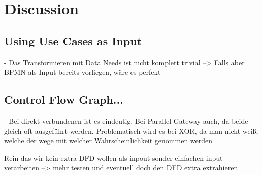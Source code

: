 \chapter{Discussion}
\label{ch:Discussion}

\section{Using Use Cases as Input}
- Das Transformieren mit Data Needs ist nicht komplett trivial --> Falls aber BPMN als Input bereits vorliegen, wäre es perfekt

\section{Control Flow Graph...}
- Bei direkt verbundenen ist es eindeutig. Bei Parallel Gateway auch, da beide gleich oft ausgeführt werden. Problematisch wird es bei XOR, da man nicht weiß, welche der wege mit welcher Wahrscheinlichkeit genommen werden



Rein das wir kein extra DFD wollen als inpout sonder einfachen input verarbeiten --> mehr testen und eventuell doch den DFD extra extrahieren